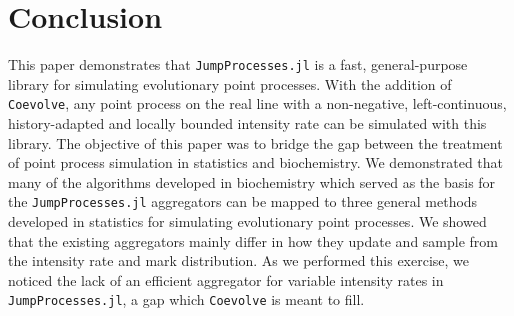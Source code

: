 \documentclass{juliacon}
\begin{document}
\section{Conclusion}

This paper demonstrates that \texttt{JumpProcesses.jl} is a fast, general-purpose library for simulating evolutionary point processes. With the addition of \texttt{Coevolve}, any point process on the real line with a non-negative, left-continuous, history-adapted and locally bounded intensity rate can be simulated with this library. The objective of this paper was to bridge the gap between the treatment of point process simulation in statistics and biochemistry. We demonstrated that many of the algorithms developed in biochemistry which served as the basis for the \texttt{JumpProcesses.jl} aggregators can be mapped to three general methods developed in statistics for simulating evolutionary point processes. We showed that the existing aggregators mainly differ in how they update and sample from the intensity rate and mark distribution. As we performed this exercise, we noticed the lack of an efficient aggregator for variable intensity rates in \texttt{JumpProcesses.jl}, a gap which \texttt{Coevolve} is meant to fill.
\end{document}
